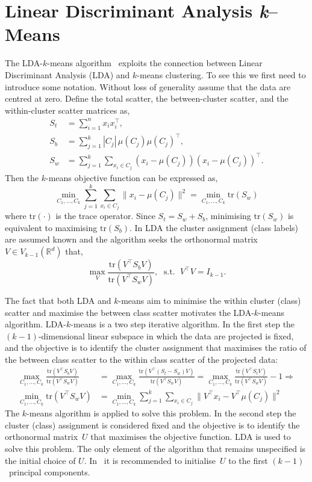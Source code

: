 \documentclass{book}
\def\R{\mathbb{R}}
\def\tr#1{\mathrm{tr}\left(#1\right)}
\begin{document}
\section{Linear Discriminant Analysis {\it k}--Means}\label{sec:ldakmeans}

The LDA-$k$-means algorithm~\cite{DingL2007} exploits the connection between
Linear Discriminant Analysis (LDA) and $k$-means clustering. To see 
this we first need to introduce some notation.
%
Without loss of generality assume that the data are centred at zero.
%
Define the total scatter, the between-cluster scatter, and the within-cluster
scatter matrices as,
%
\begin{align*}
%
S_t & = \sum_{i=1}^n x_i x_i^\top, \\
%
S_b & = \sum_{j=1}^k |C_j| \, \mu(C_j) \mu(C_j)^\top, \\
%
S_w & = \sum_{j=1}^k \sum_{x_i \in C_j} (x_i - \mu(C_j))(x_i - \mu(C_j))^\top.
%
\end{align*}
%
Then the $k$-means objective function can be expressed as,
%
\begin{equation}\label{eq:kmeans}
%
\min_{C_1,\ldots,C_k} \sum_{j=1}^k \sum_{x_i \in C_j} \|x_i - \mu(C_j)\|^2 = \min_{C_1,\ldots,C_k} \tr{S_w}
%
%
\end{equation}
where $\tr{\cdot}$ is the trace operator. Since $S_t = S_w + S_b$, minimising
$\tr{S_w}$ is equivalent to maximising $\tr{S_b}$.
%
In LDA the cluster assignment (class labels) are assumed known and the
algorithm seeks the orthonormal matrix $V \in V_{k-1}(\R^d)$ that,
%
\begin{equation}\label{eq:ldakm}
%
\max_{V} \frac{ \tr{V^\top S_b V}}{\tr{V^\top S_w V}}, \; \text{ s.t. } \; V^\top V = I_{k-1}.
%
\end{equation}

The fact that both LDA and $k$-means aim to minimise the within cluster (class)
scatter and maximise the between class scatter motivates the LDA-$k$-means
algorithm. 
%
LDA-$k$-means is a two step iterative algorithm. In the first step the
$(k-1)$-dimensional linear subspace in which the data are projected is
fixed, and the objective is to identify the cluster assignment that maximises
the ratio of the between class scatter to the within class scatter of the
projected data:
%
\begin{align*}
%
\max_{C_1,\ldots,C_k} \frac{\tr{V^\top S_b V}}{\tr{V^\top S_w V}} & = 
%
\max_{C_1,\ldots,C_k} \frac{\tr{V^\top (S_t - S_w) V}}{\tr{V^\top S_w V}} = 
%
\max_{C_1,\ldots,C_k} \frac{\tr{V^\top S_t V}}{\tr{V^\top S_w V}} -1 \Rightarrow \\
%
\min_{C_1,\ldots,C_k} \tr{V^\top S_w V} & = \min_{C_1,\ldots,C_k} \sum_{j=1}^k \sum_{x_i \in C_j} \|V^\top x_i - V^\top \mu(C_j)\|^2
%
\end{align*}
%
The $k$-means algorithm is applied to solve this problem.
%
In the second step the cluster (class) assignment is considered fixed and
the objective is to identify the orthonormal matrix~$U$ that maximises
the objective function. LDA is used to solve this problem.
The only element of the algorithm that remains
unspecified is the initial choice of $U$. In~\cite{DingL2007} it is
recommended to initialise~$U$ to the first $(k-1)$~principal components.
\end{document}
